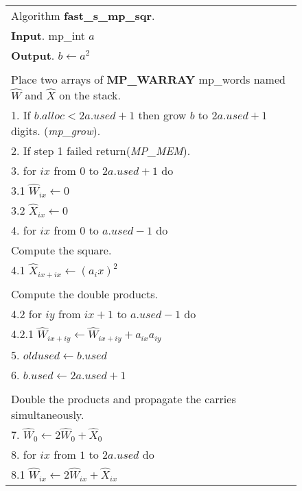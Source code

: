 \documentclass[b5paper]{book}
\begin{document}
\newpage\begin{figure}[!here]
\begin{small}
\begin{center}
\begin{tabular}{l}
\hline Algorithm \textbf{fast\_s\_mp\_sqr}. \\
\textbf{Input}.   mp\_int $a$ \\
\textbf{Output}.  $b \leftarrow a^2$ \\
\hline \\
Place two arrays of \textbf{MP\_WARRAY} mp\_words named $\hat W$ and $\hat {X}$ on the stack. \\
1.  If $b.alloc < 2a.used + 1$ then grow $b$ to $2a.used + 1$ digits.  (\textit{mp\_grow}). \\
2.  If step 1 failed return(\textit{MP\_MEM}). \\
3.  for $ix$ from $0$ to $2a.used + 1$ do \\
\hspace{3mm}3.1  $\hat W_{ix} \leftarrow 0$ \\
\hspace{3mm}3.2  $\hat {X}_{ix} \leftarrow 0$ \\
4.  for $ix$ from $0$ to $a.used - 1$ do \\
\hspace{3mm}Compute the square.\\
\hspace{3mm}4.1  $\hat {X}_{ix+ix} \leftarrow \left ( a_ix \right )^2$ \\
\\
\hspace{3mm}Compute the double products.\\
\hspace{3mm}4.2  for $iy$ from $ix + 1$ to $a.used - 1$ do \\
\hspace{6mm}4.2.1  $\hat W_{ix+iy} \leftarrow \hat W_{ix+iy} + a_{ix}a_{iy}$ \\
5.  $oldused \leftarrow b.used$ \\
6.  $b.used \leftarrow 2a.used + 1$ \\
\\
Double the products and propagate the carries simultaneously. \\
7.  $\hat W_0 \leftarrow 2 \hat W_0 + \hat {X}_0$ \\
8.  for $ix$ from $1$ to $2a.used$ do \\
\hspace{3mm}8.1 $\hat W_{ix} \leftarrow 2 \hat W_{ix} + \hat {X}_{ix}$ \\

\end{tabular}
\end{center}
\end{small}
\end{figure}
\end{document}
